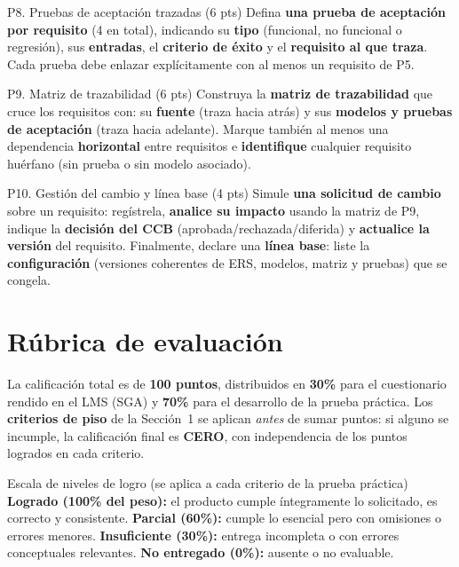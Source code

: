 \documentclass[11pt,a4paper,oneside]{article}
\begin{document}
\begin{tarea}{P8. Pruebas de aceptaci\'on trazadas \hfill (6 pts)}
Defina \textbf{una prueba de aceptaci\'on por requisito} (4 en total), indicando su \textbf{tipo} (funcional, no funcional o regresi\'on), sus \textbf{entradas}, el \textbf{criterio de \'exito} y el \textbf{requisito al que traza}. Cada prueba debe enlazar expl\'icitamente con al menos un requisito de P5.
\end{tarea}

\begin{tarea}{P9. Matriz de trazabilidad \hfill (6 pts)}
Construya la \textbf{matriz de trazabilidad} que cruce los requisitos con: su \textbf{fuente} (traza hacia atr\'as) y sus \textbf{modelos y pruebas de aceptaci\'on} (traza hacia adelante). Marque tambi\'en al menos una dependencia \textbf{horizontal} entre requisitos e \textbf{identifique} cualquier requisito hu\'erfano (sin prueba o sin modelo asociado).
\end{tarea}

\begin{tarea}{P10. Gesti\'on del cambio y l\'inea base \hfill (4 pts)}
Simule \textbf{una solicitud de cambio} sobre un requisito: reg\'istrela, \textbf{analice su impacto} usando la matriz de P9, indique la \textbf{decisi\'on del CCB} (aprobada/rechazada/diferida) y \textbf{actualice la versi\'on} del requisito. Finalmente, declare una \textbf{l\'inea base}: liste la \textbf{configuraci\'on} (versiones coherentes de ERS, modelos, matriz y pruebas) que se congela.
\end{tarea}

\section{Rúbrica de evaluaci\'on}

La calificaci\'on total es de \textbf{100 puntos}, distribuidos en \textbf{30\%} para el cuestionario rendido en el LMS (SGA) y \textbf{70\%} para el desarrollo de la prueba pr\'actica. Los \textbf{criterios de piso} de la Secci\'on~1 se aplican \emph{antes} de sumar puntos: si alguno se incumple, la calificaci\'on final es \textbf{CERO}, con independencia de los puntos logrados en cada criterio.

\begin{concepto}{Escala de niveles de logro (se aplica a cada criterio de la prueba pr\'actica)}
\textbf{Logrado (100\% del peso):} el producto cumple \'integramente lo solicitado, es correcto y consistente. \quad \textbf{Parcial (60\%):} cumple lo esencial pero con omisiones o errores menores. \quad \textbf{Insuficiente (30\%):} entrega incompleta o con errores conceptuales relevantes. \quad \textbf{No entregado (0\%):} ausente o no evaluable.
\end{concepto}
\end{document}
